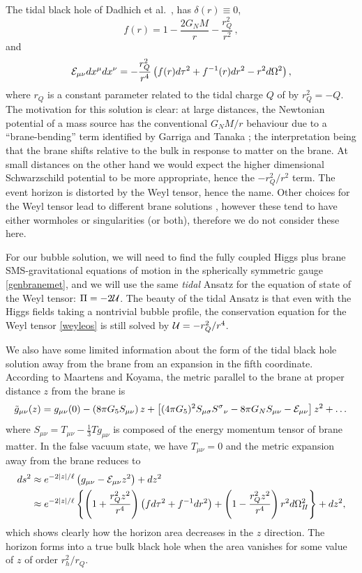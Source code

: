 \documentclass[aps,12pt,prd,superscriptaddress,preprintnumbers, 
	amssymb,
	amsmath,
	notitlepage,
	longbibliography,
	nofootinbib]{revtex4-1}
\newcommand{\be}{\begin{equation}}
\newcommand{\ee}{\end{equation}}
\newcommand{\beal}{\begin{aligned}}
\newcommand{\eeal}{\end{aligned}}
\begin{document}
The tidal black hole of Dadhich et al.\ \cite{Dadhich:2000am}, 
has $\delta(r) \equiv 0$, 
\be
f(r)=1-\frac{2G_NM}{r}-\frac{r_Q^2}{r^2}\,,
\label{vbh}
\ee
and
\be
{\cal E}_{\mu\nu}dx^\mu dx^\nu=-\frac{r_Q^2}{ r^4}\left(
f(r) d\tau^2+f^{-1}(r) dr^2-r^2d\Omega^2\right),
\label{conf}
\ee
where $r_Q$ is a constant parameter related to the tidal charge $Q$
of \cite{Dadhich:2000am} by $r_Q^2 = -Q$. The motivation
for this solution is clear: at large distances, the Newtonian potential
of a mass source has the conventional $G_NM/r$ behaviour due to 
a ``brane-bending'' term identified by Garriga and Tanaka \cite{Garriga:1999yh}; 
the interpretation being that the brane shifts relative to the bulk in 
response to matter on the brane. At small distances on the other hand 
we would expect the higher dimensional Schwarzschild potential to be 
more appropriate, hence the $-r_Q^2/r^2$ term. The event horizon is 
distorted by the Weyl tensor, hence the name. 
Other choices for the Weyl tensor
lead to different brane solutions \cite{Gregory:2004vt}, however these 
tend to have either wormholes or singularities (or both), therefore we
do not consider these here.

For our bubble solution, we will need to find the fully coupled 
Higgs plus brane SMS-gravitational equations of motion in the 
spherically symmetric gauge \eqref{genbranemet}, and we
will use the same \emph{tidal} Ansatz for the equation of state
of the Weyl tensor: $\Pi = -2{\cal U}$. The beauty of the tidal Ansatz
is that even with the Higgs fields taking a nontrivial bubble profile, 
the conservation equation for the Weyl tensor \eqref{weyleos}
is still solved by ${\cal U} = - r_Q^2/r^4$.

We also have some limited information about the form of the tidal 
black hole solution away from the brane from an expansion in the 
fifth coordinate. According to Maartens and Koyama, \cite{Maartens:2010ar}
the metric parallel to the brane at proper distance $z$ from the brane is
\be
\tilde g_{\mu\nu}(z) = g_{\mu\nu}(0) - ( 8\pi G_5 S_{\mu\nu}) \, z
+\left [ (4\pi G_5)^2 S_{\mu\sigma}S^\sigma{}_\nu
- 8\pi G_N S_{\mu\nu} - {\cal E}_{\mu\nu} \right] z^2 +\dots
\ee
where $S_{\mu\nu}=T_{\mu\nu}-\frac13 T g_{\mu\nu}$ is composed of 
the energy momentum tensor of brane matter.
In the false vacuum state, we have $T_{\mu\nu}=0$ and the metric 
expansion away from the brane reduces to
\be
\beal
ds^2&\approx e^{-2|z|/\ell}\left(g_{\mu\nu}-{\cal E}_{\mu\nu}z^2\right)+dz^2\\
& \approx e^{-2|z|/\ell}\left\{
\left(1 + \frac{r_Q^2z^2}{r^4}\right) \left( fd\tau^2+f^{-1}dr^2\right)
+ \left(1-\frac{r_Q^2z^2}{r^4}\right) r^2d\Omega^2_{I\!I} \right\}+dz^2,
\eeal
\ee
which shows clearly how the horizon area decreases in the 
$z$ direction. The horizon forms into a true bulk black hole when 
the area vanishes for some value of $z$ of order $r_h^2/r_Q$.
\end{document}
